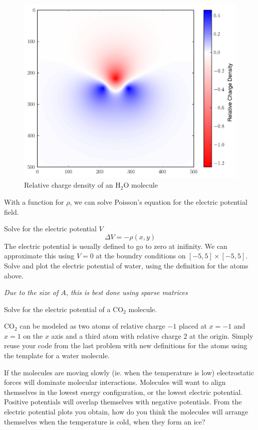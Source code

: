 \begin{figure}
\includegraphics[width=\textwidth]{waterRho.pdf}
\caption{Relative charge density of an H$_2$O molecule}
\end{figure}

With a function for $\rho$, we can solve Poisson's equation for the electric potential field.
\begin{problem}
Solve for the electric potential $V$
\[\Delta V = -\rho(x,y)\]
The electric potential is usually defined to go to zero at inifinity.
We can approximate this using $V=0$ at the boundry conditions on $[-5,5]\times [-5,5]$.
Solve and plot the electric potential of water, using the definition for the atoms above.

\textit{Due to the size of $A$, this is best done using sparse matrices}
\end{problem}

\begin{problem}
Solve for the electric potential of a CO$_2$ molecule.

CO$_2$ can be modeled as two atoms of relative charge $-1$ placed at $x=-1$ and $x=1$ on the $x$ axis and a third atom with relative charge $2$ at the origin.
Simply reuse your code from the last problem with new definitions for the atoms using the template for a water molecule.

If the molecules are moving slowly (ie. when the temperature is low) electrostatic forces will dominate molecular interactions.
Molecules will want to align themselves in the lowest energy configuration, or the lowest electric potential.
Positive potentials will overlap themselves with negative potentials.
From the electric potential plots you obtain, how do you think the molecules will arrange themselves when the temperature is cold, when they form an ice?
\end{problem}

